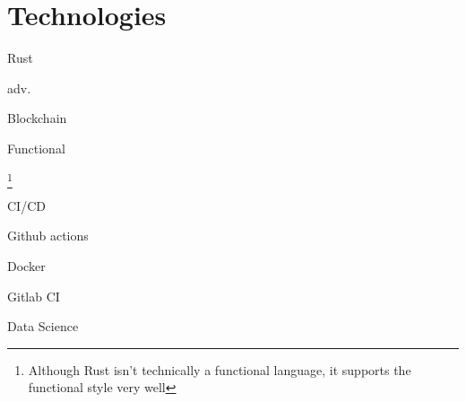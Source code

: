 \documentclass{CurriculumVitae}[10pt, condensed]
\begin{document}
\section*{Technologies}
\vfill
  \begin{multicols}{4}
    \begin{skills}{Rust}
    \item adv.~
    \item {}
    \item {}
    \item {}
    \item {}
    \end{skills}

    \begin{skills}{Blockchain}
    \item {}
    \item {}
    \item {}
    \item {}
    \end{skills}

    \begin{skills}{Functional}
    \item {}
    \item {}\footnote{Although Rust isn't technically a functional language, it supports the functional style very well}
    \item {}
    \item {}
    \end{skills}

    \begin{skills}{CI/CD}
    \item Github actions
    \item Docker
    \item {}
    \item {}
    \item Gitlab CI
    \end{skills}


    \begin{skills}{Data Science}
    \item {}
    \item {}
    \item {}
    \item {}
    \end{skills}


\end{multicols}
\end{document}
